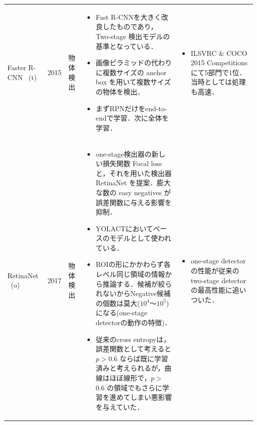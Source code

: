 \documentclass[twocolumn]{jsarticle} %
\begin{document}
\begin{table}
\begin{center}
\begin{tabularx}{\linewidth}{XcXp{7cm}X}
            Faster R-CNN \cite{RHGS15} \ (t)\footnote[2]  & 2015 & 物体検出 & 
            \begin{itemize}
                \vspace{-0.7\baselineskip}
                \setlength{\leftskip}{-3mm}
                \item Fast R-CNNを大きく改良したものであり，Two-stage 検出モデルの基準となっている．
                \item 画像ピラミッドの代わりに複数サイズの anchor box を用いて複数サイズの物体を検出．
                \item まずRPNだけをend-to-endで学習．次に全体を学習．
            \end{itemize}
            &
            \begin{itemize}
                \vspace{-0.7\baselineskip}
                \setlength{\leftskip}{-3mm}
                \item ILSVRC \& COCO 2015 Competitions にて5部門で1位．当時としては処理も高速．
            \end{itemize}
            \\

            RetinaNet \cite{LGGHD17} \ (o)\footnote[1] & 2017 & 物体検出 & 
            \begin{itemize}
                \vspace{-0.7\baselineskip}
                \setlength{\leftskip}{-3mm}
                \item one-stage検出器の新しい損失関数 Focal loss と，それを用いた検出器 RetinaNet を提案．膨大な数の easy negatives が誤差関数に与える影響を抑制．
                \item YOLACTにおいてベースのモデルとして使われている．
                \item ROIの形にかかわらず各レベル同じ領域の情報から推論する．候補が絞られないからNegative候補の個数は莫大($10^4$〜$10^5$)になる(one-stage detectorの動作の特徴)．
                \item 従来のcross entropyは，誤差関数として考えると $p{>}$0.6 ならば既に学習済みと考えられるが，曲線はほぼ線形で，$p{>}$0.6 の領域でもさらに学習を進めてしまい悪影響を与えていた．
            \end{itemize}
            &
            \begin{itemize}
                \vspace{-0.7\baselineskip}
                \setlength{\leftskip}{-3mm}
                \item one-stage detectorの性能が従来のtwo-stage detectorの最高性能に追いついた．
            \end{itemize}
            \\


\end{tabularx}
\end{center}
\end{table}
\end{document}
